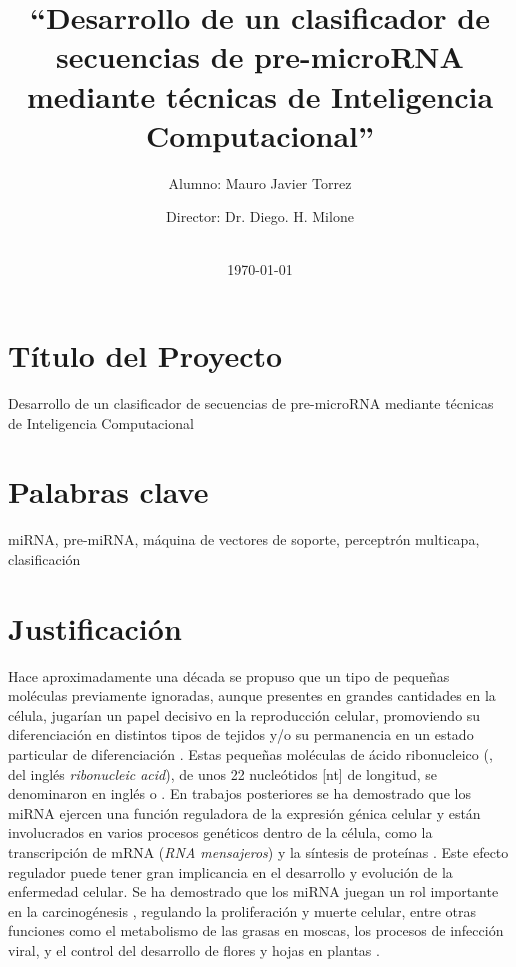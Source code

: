 \documentclass[12pt,bibliography=oldstyle,DIV=14,parskip=full-,titlepage]{scrartcl}
\begin{document}
%
\titlehead{\center\large Universidad Nacional del Litoral\\
  Facultad de Ingeniería y Ciencias Hídricas}
%
\subject{Propuesta de Proyecto Final de Carrera\\Ingeniería en
  Informática}
%
\title{\LARGE ``Desarrollo de un clasificador de secuencias de pre-microRNA
  mediante técnicas de Inteligencia Computacional''}
%
%
\author{{Alumno: Mauro Javier Torrez}\and{Director: Dr. Diego. H. Milone}}
%
\date{\-\\[2em]\today}
\renewcommand*{\titlepagestyle}{empty}
\maketitle
\setcounter{page}{1}
%
%
\section{Título del Proyecto}
Desarrollo de un clasificador de
secuencias de pre-microRNA mediante
técnicas de Inteligencia Computacional
%
%
\section{Palabras clave}
miRNA, pre-miRNA, máquina de vectores
de soporte, perceptrón multicapa, clasificación
%
%
\section{Justificación}
%
%
Hace aproximadamente una década se propuso que un tipo de pequeñas
moléculas previamente ignoradas, aunque presentes en grandes
cantidades en la célula, jugarían un papel decisivo en la reproducción
celular, promoviendo su diferenciación en distintos tipos de tejidos
y/o su permanencia en un estado particular de diferenciación
\cite{lee-mammal}.  Estas pequeñas moléculas de ácido ribonucleico
(, del inglés \emph{ribonucleic acid}), de unos 22
nucleótidos [nt] de longitud, se denominaron en inglés  o
.  En trabajos posteriores se ha demostrado que los miRNA
ejercen una función reguladora de la expresión génica celular
\cite{bartel116} y están involucrados en varios procesos genéticos
dentro de la célula, como la transcripción de mRNA (\emph{RNA
  mensajeros}) y la síntesis de proteínas \cite{lili}.  Este efecto
regulador puede tener gran implicancia en el desarrollo y evolución de
la enfermedad celular. Se ha demostrado que los miRNA juegan un rol
importante en la carcinogénesis \cite{aurora}\cite{lili}, regulando la
proliferación y muerte celular, entre otras funciones como el
metabolismo de las grasas en moscas, los procesos de infección viral,
y el control del desarrollo de flores y hojas en plantas
\cite{bartel116}\cite{lecellier}.
\end{document}
